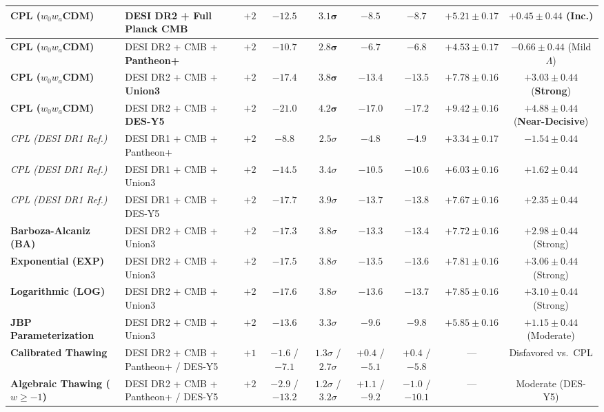 \documentclass[aps,prd,preprint,superscriptaddress,nofootinbib]{revtex4-2}
\begin{document}
\begin{table}[!htbp]
{\begin{tabular}{llccccccc}
\textbf{CPL ($w_0 w_a$CDM)} & DESI DR2 + Full Planck CMB & $+2$ & $-12.5$ & $\mathbf{3.1}\boldsymbol{\sigma}$ & $-8.5$ & $-8.7$ & $+5.21 \pm 0.17$ & $+0.45 \pm 0.44$ (Inc.) \\
\midrule
\textbf{CPL ($w_0 w_a$CDM)} & DESI DR2 + CMB + \textbf{Pantheon+} & $+2$ & $-10.7$ & $\mathbf{2.8}\boldsymbol{\sigma}$ & $-6.7$ & $-6.8$ & $+4.53 \pm 0.17$ & $-0.66 \pm 0.44$ (Mild $\Lambda$) \\
\textbf{CPL ($w_0 w_a$CDM)} & DESI DR2 + CMB + \textbf{Union3} & $+2$ & $-17.4$ & $\mathbf{3.8}\boldsymbol{\sigma}$ & $-13.4$ & $-13.5$ & $+7.78 \pm 0.16$ & $\mathbf{+3.03 \pm 0.44}$ (\textbf{Strong}) \\
\textbf{CPL ($w_0 w_a$CDM)} & DESI DR2 + CMB + \textbf{DES-Y5} & $+2$ & $-21.0$ & $\mathbf{4.2}\boldsymbol{\sigma}$ & $-17.0$ & $-17.2$ & $+9.42 \pm 0.16$ & $\mathbf{+4.88 \pm 0.44}$ (\textbf{Near-Decisive}) \\
\midrule
\emph{CPL (DESI DR1 Ref.)} & DESI DR1 + CMB + Pantheon+ & $+2$ & $-8.8$ & $2.5\sigma$ & $-4.8$ & $-4.9$ & $+3.34 \pm 0.17$ & $-1.54 \pm 0.44$ \\
\emph{CPL (DESI DR1 Ref.)} & DESI DR1 + CMB + Union3 & $+2$ & $-14.5$ & $3.4\sigma$ & $-10.5$ & $-10.6$ & $+6.03 \pm 0.16$ & $+1.62 \pm 0.44$ \\
\emph{CPL (DESI DR1 Ref.)} & DESI DR1 + CMB + DES-Y5 & $+2$ & $-17.7$ & $3.9\sigma$ & $-13.7$ & $-13.8$ & $+7.67 \pm 0.16$ & $+2.35 \pm 0.44$ \\
\midrule
\textbf{Barboza-Alcaniz (BA)} & DESI DR2 + CMB + Union3 & $+2$ & $-17.3$ & $3.8\sigma$ & $-13.3$ & $-13.4$ & $+7.72 \pm 0.16$ & $+2.98 \pm 0.44$ (Strong) \\
\textbf{Exponential (EXP)} & DESI DR2 + CMB + Union3 & $+2$ & $-17.5$ & $3.8\sigma$ & $-13.5$ & $-13.6$ & $+7.81 \pm 0.16$ & $+3.06 \pm 0.44$ (Strong) \\
\textbf{Logarithmic (LOG)} & DESI DR2 + CMB + Union3 & $+2$ & $-17.6$ & $3.8\sigma$ & $-13.6$ & $-13.7$ & $+7.85 \pm 0.16$ & $+3.10 \pm 0.44$ (Strong) \\
\textbf{JBP Parameterization} & DESI DR2 + CMB + Union3 & $+2$ & $-13.6$ & $3.3\sigma$ & $-9.6$ & $-9.8$ & $+5.85 \pm 0.16$ & $+1.15 \pm 0.44$ (Moderate) \\
\midrule
\textbf{Calibrated Thawing} & DESI DR2 + CMB + Pantheon+ / DES-Y5 & $+1$ & $-1.6$ / $-7.1$ & $1.3\sigma$ / $2.7\sigma$ & $+0.4$ / $-5.1$ & $+0.4$ / $-5.8$ & --- & Disfavored vs.\ CPL \\
\textbf{Algebraic Thawing ($w\ge -1$)} & DESI DR2 + CMB + Pantheon+ / DES-Y5 & $+2$ & $-2.9$ / $-13.2$ & $1.2\sigma$ / $3.2\sigma$ & $+1.1$ / $-9.2$ & $-1.0$ / $-10.1$ & --- & Moderate (DES-Y5) \\

\end{tabular}}
\end{table}
\end{document}

